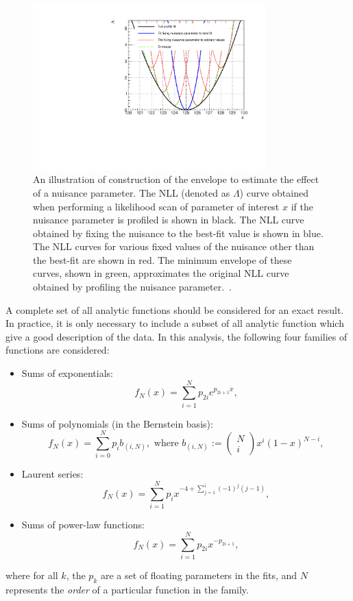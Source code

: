 \begin{figure}[ht!]
\centering
\includegraphics[width=0.8\textwidth]{modellingFigures/envelope_cartoon.pdf} 
\caption{An illustration of construction of the envelope to estimate the effect of a nuisance parameter. The NLL (denoted as $\Lambda$) curve obtained when performing a likelihood scan of parameter of interest $x$ if the nuisance parameter is profiled is shown in black. The NLL curve obtained by fixing the nuisance to the best-fit value is shown in blue. The NLL curves for various fixed values of the nuisance other than the best-fit are shown in red. The minimum envelope of these curves, shown in green, approximates the original NLL curve obtained by profiling the nuisance parameter.~\cite{DiscreteProfiling}.}

\label{fig:model:bkg_envelope}
\end{figure}

A complete set of all analytic functions should be considered for an exact result. In practice, it is only necessary to include a subset of all analytic function which give a good description of the data. In this analysis, the following four families of functions are considered:

\begin{itemize}
\item Sums of exponentials: $$ f_{N}(x)= \sum^{N}_{i=1} p_{2i} e^{p_{2i+1} x} ,$$
\item Sums of polynomials (in the Bernstein basis): $$ f_{N}(x) = \sum^{N}_{i=0} p_{i} b_{(i,N)}, \text{ where } b_{(i,N)}:= \begin{pmatrix} N \\ i \end{pmatrix} x^i (1-x)^{N-i} ,$$
\item Laurent series: $$ f_{N}(x)= \sum^{N}_{i=1} p_{i} x^{-4 + \sum^{i}_{j=1} (-1)^{j} (j-1)},$$
\item Sums of power-law functions: $$ f_{N}(x)= \sum^{N}_{i=1} p_{2i} x^{-p_{2i+1}},$$
\end{itemize}
where for all $k$, the $p_k$ are a set of floating parameters in the fits, and $N$ represents the \emph{order} of a particular function in the family.  

